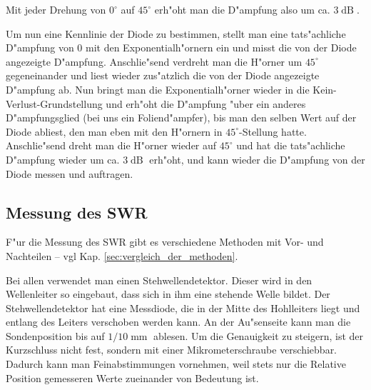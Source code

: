 \documentclass[a4paper,12pt]{article}
\begin{document}
Mit jeder Drehung von $0^\circ$ auf $45^\circ$ erh"oht man die
D"ampfung also um ca. $3\operatorname{dB}$.

Um nun eine Kennlinie der Diode zu bestimmen, stellt man eine
tats"achliche D"ampfung von $0$ mit den Exponentialh"ornern ein und
misst die von der Diode angezeigte D"ampfung. Anschlie"send verdreht
man die H"orner um $45^\circ$ gegeneinander und liest wieder
zus"atzlich die von der Diode angezeigte D"ampfung ab. Nun bringt man
die Exponentialh"orner wieder in die Kein-Verlust-Grundstellung und
erh"oht die D"ampfung "uber ein anderes D"ampfungsglied (bei uns ein
Foliend"ampfer), bis man den selben Wert auf der Diode abliest, den
man eben mit den H"ornern in $45^\circ$-Stellung hatte. Anschlie"send
dreht man die H"orner wieder auf $45^\circ$ und hat die tats"achliche
D"ampfung wieder um ca. $3\operatorname{dB}$ erh"oht, und kann wieder
die D"ampfung von der Diode messen und auftragen.
 




\subsection{Messung des SWR}
\label{sec:messung_des_swr}

F"ur die Messung des SWR gibt es verschiedene Methoden mit Vor- und
Nachteilen -- vgl Kap. \ref{sec:vergleich_der_methoden}.

Bei allen verwendet man einen Stehwellendetektor. Dieser wird in den
Wellenleiter so eingebaut, dass sich in ihm eine stehende Welle
bildet. Der Stehwellendetektor hat eine Messdiode, die in der Mitte
des Hohlleiters liegt und entlang des Leiters verschoben werden
kann. An der Au"senseite kann man die Sondenposition bis auf
$1/10\operatorname{mm}$ ablesen. Um die Genauigkeit zu steigern, ist
der Kurzschluss nicht fest, sondern mit einer Mikrometerschraube
verschiebbar. Dadurch kann man Feinabstimmungen vornehmen, weil stets
nur die Relative Position gemesseren Werte zueinander von Bedeutung ist.
\end{document}

